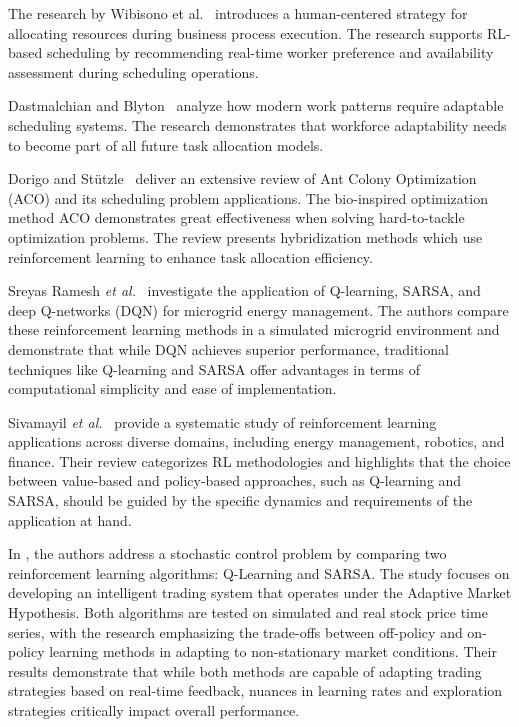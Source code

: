 \documentclass[%
aip,
cp,  %
reprint
]{revtex4-2}
\begin{document}
	The research by Wibisono et al.~\cite{wibisono2016} introduces a human-centered
	strategy for allocating resources during business process execution. The research
	supports RL-based scheduling by recommending real-time worker preference and availability
	assessment during scheduling operations.
	
	Dastmalchian and Blyton~\cite{dastmalchian2001} analyze how modern work patterns
	require adaptable scheduling systems. The research demonstrates that workforce
	adaptability needs to become part of all future task allocation models.
	
	Dorigo and Stützle~\cite{dorigo2016} deliver an extensive review of Ant Colony
	Optimization (ACO) and its scheduling problem applications. The bio-inspired optimization
	method ACO demonstrates great effectiveness when solving hard-to-tackle optimization
	problems. The review presents hybridization methods which use reinforcement
	learning to enhance task allocation efficiency.
	
	Sreyas Ramesh \textit{et al.}~\cite{turn0file0} investigate the application of Q-learning, SARSA, and deep Q-networks (DQN) for microgrid energy management. The authors compare these reinforcement learning methods in a simulated microgrid environment and demonstrate that while DQN achieves superior performance, traditional techniques like Q-learning and SARSA offer advantages in terms of computational simplicity and ease of implementation.
	
	Sivamayil \textit{et al.}~\cite{turn0file1} provide a systematic study of reinforcement learning applications across diverse domains, including energy management, robotics, and finance. Their review categorizes RL methodologies and highlights that the choice between value-based and policy-based approaches, such as Q-learning and SARSA, should be guided by the specific dynamics and requirements of the application at hand.
	
	In \cite{Corazza2015}, the authors address a stochastic control problem by comparing two reinforcement learning algorithms: Q-Learning and SARSA. The study focuses on developing an intelligent trading system that operates under the Adaptive Market Hypothesis. Both algorithms are tested on simulated and real stock price time series, with the research emphasizing the trade-offs between off-policy and on-policy learning methods in adapting to non-stationary market conditions. Their results demonstrate that while both methods are capable of adapting trading strategies based on real-time feedback, nuances in learning rates and exploration strategies critically impact overall performance.
	
\end{document}
